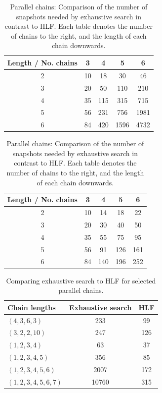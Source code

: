 \begin{table}[ht]
  \centering
  \begin{subtable}{.45\textwidth}
    \centering
    \begin{tabular}[ht]{c|cccc}
      Length / No. chains & 3 & 4 & 5 & 6 \\
      \hline
      2 & 10 & 18 & 30 & 46 \\
      3 & 20 & 50 & 110 & 210 \\
      4 & 35 & 115 & 315 & 715 \\
      5 & 56 & 231 & 756 & 1981 \\
      6 & 84 & 420 & 1596 & 4732
    \end{tabular}
    \caption{Number of snapshots with examined by exhaustive search.}
  \end{subtable}
  \quad
  \begin{subtable}{.45\textwidth}
    \centering
    \begin{tabular}[ht]{c|cccc}
      Length / No. chains & 3 & 4 & 5 & 6 \\
      \hline
      2 & 10 & 14 & 18 & 22 \\
      3 & 20 & 30 & 40 & 50 \\
      4 & 35 & 55 & 75 & 95 \\
      5 & 56 & 91 & 126 & 161 \\
      6 & 84 & 140 & 196 & 252
    \end{tabular}
    \caption{Number of snapshots examined by HLF.}
  \end{subtable}
  \caption{Parallel chains: Comparison of the number of snapshots needed by exhaustive search in contrast to HLF. Each table denotes the number of chains to the right, and the length of each chain downwards.}
  \label{tab:parallel-chains-comparison-leaf-hlf}
\end{table}

\begin{table}[ht]
  \centering
  \begin{tabular}[ht]{lcc}
    Chain lengths & Exhaustive search & HLF \\
    \hline
    $(4,3,6,3)$ & 233 & 99 \\
    $(3,2,2,10)$ & 247 & 126 \\
    $(1,2,3,4)$ & 63 & 37 \\
    $(1,2,3,4,5)$ & 356 & 85 \\
    $(1,2,3,4,5,6)$ & 2007 & 172 \\
    $(1,2,3,4,5,6,7)$ & 10760 & 315
  \end{tabular}
  \caption{Comparing exhaustive search to HLF for selected parallel chains.}
  \label{tab:selected-parallel-chains-comparison}
\end{table}

